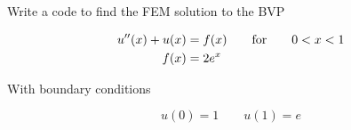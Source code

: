 \documentclass[12pt]{report}
\begin{document}
\begin{tcolorbox}[title=Task (Difficult)]
Write a code to find the FEM solution to the BVP

\begin{equation}\label{BVPd}
\begin{split}
u''(x)+u(x)&=f(x)\qquad\textnormal{for}\qquad{0}<x<1\\
f(x)&=2e^x
\end{split}
\end{equation}

With boundary conditions 

\begin{equation*}
u(0)=1\qquad{u}(1)=e
\end{equation*}
\end{tcolorbox}
\end{document}
